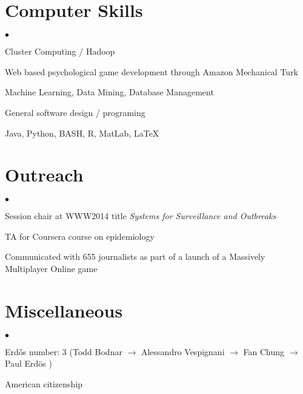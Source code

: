 \documentclass[margin,line]{res}
\newenvironment{list2}{
  \begin{list}{$\bullet$}{%
      \setlength{\itemsep}{0in}
      \setlength{\parsep}{0in} \setlength{\parskip}{0in}
      \setlength{\topsep}{0in} \setlength{\partopsep}{0in} 
      \setlength{\leftmargin}{10pt}}}{\end{list}}
\begin{document}
\begin{resume}
\section{\sc Computer Skills} 
\begin{list2}
\item Cluster Computing / Hadoop 
\item Web based psychological game development through Amazon Mechanical Turk
\item Machine Learning, Data Mining, Database Management
\item General software design / programing
\item Java, Python, BASH, R, MatLab, \LaTeX
\end{list2}

\section{\sc Outreach}
\begin{list2}
\item Session chair at WWW2014 title \emph{Systems for Surveillance and Outbreaks}
\item TA for Coursera course on epidemiology
\item Communicated with 655 journalists as part of a launch of a Massively Multiplayer Online game
\end{list2}


\section{\sc Miscellaneous}
\begin{list2}
\item Erd\H{o}s number: 3 (Todd Bodnar \(\rightarrow\) Alessandro Vespignani \(\rightarrow\) Fan Chung \(\rightarrow\) Paul Erd\"os )
\item American citizenship
\end{list2}


\end{resume}
\end{document}
